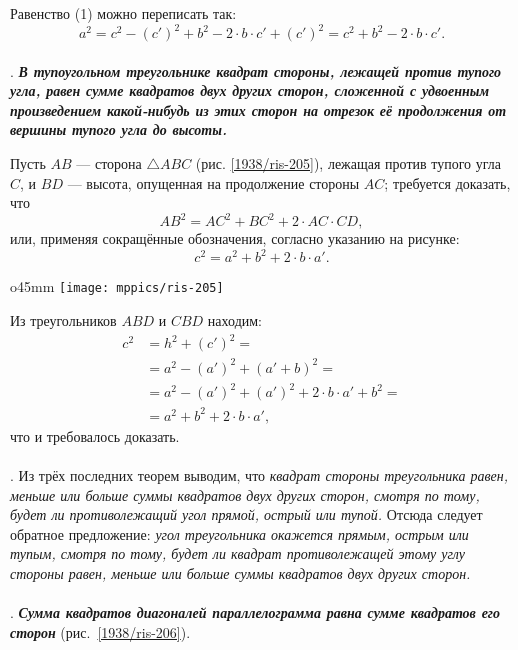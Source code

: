 Равенство (1) можно переписать так:
\[a^2=c^2-(c')^2+b^2-2\cdot b\cdot c'+(c')^2=c^2+b^2-2\cdot b\cdot c'.\]

{\sloppy
\paragraph{}\label{1938/195}
\mbox{.}
\textbf{\emph{В тупоугольном треугольнике квадрат стороны, лежащей против тупого угла, равен сумме квадратов двух других сторон, сложенной с удвоенным произведением какой-нибудь из этих сторон на отрезок её продолжения от вершины тупого угла до высоты.}}

}



Пусть $AB$ — сторона $\triangle ABC$ (рис. \ref{1938/ris-205}), лежащая против тупого угла $C$, и $BD$ — высота, опущенная на продолжение стороны $AC$;
требуется доказать, что
\[AB^2=AC^2+BC^2+2\cdot AC \cdot  CD,\]
или, применяя сокращённые обозначения, согласно указанию на рисунке:
\[c^2=a^2+b^2+2\cdot b\cdot a'.\]

\begin{wrapfigure}{o}{45mm}
\vskip-8mm
\centering
\texttt{[image: mppics/ris-205]}
\caption{}\label{1938/ris-205}
\vskip0mm
\end{wrapfigure}

Из треугольников $ABD$ и $CBD$ находим:
\begin{align*}
c^2&=h^2+(c')^2=
\\
&=a^2-(a')^2+(a'+b)^2=
\\
&=a^2-(a')^2+(a')^2+2\cdot b\cdot a'+b^2=
\\
&=a^2+b^2+2\cdot b\cdot a',
\end{align*}
что и требовалось доказать.

\paragraph{}\label{1938/196}
.
Из трёх последних теорем выводим, что \emph{квадрат стороны треугольника равен, меньше или больше суммы квадратов двух других сторон, смотря по тому, будет ли противолежащий угол прямой, острый или тупой.}
Отсюда следует обратное предложение:
\emph{угол треугольника окажется прямым, острым или тупым, смотря по тому, будет ли квадрат противолежащей этому углу стороны равен, меньше или больше суммы квадратов двух других сторон.}

\paragraph{}\label{1938/197}
.
\textbf{\emph{Сумма квадратов диагоналей параллелограмма равна сумме квадратов его сторон}} (рис.~\ref{1938/ris-206}).

